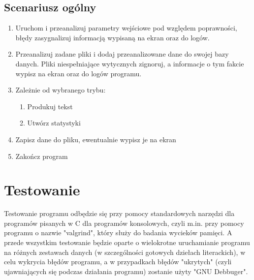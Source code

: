 \documentclass[a4paper,11pt]{article}
\begin{document}
	\subsection{Scenariusz ogólny}
	\begin{enumerate}
		\item Uruchom i przeanalizuj parametry wejściowe pod względem poprawności, błędy zasygnalizuj informacją wypisaną na ekran oraz do logów.
		\item Przeanalizuj zadane pliki i dodaj przeanalizowane dane do swojej bazy danych. Pliki niespełniające wytycznych zignoruj, a informacje o tym fakcie wypisz na ekran oraz do logów programu.
		\item Zależnie od wybranego trybu: 
			\begin{enumerate}
				\item Produkuj tekst
				\item Utwórz statystyki
			\end{enumerate}
		\item Zapisz dane do pliku, ewentualnie wypisz je na ekran
		\item Zakończ program
	\end{enumerate}
	
\section{Testowanie}
	Testowanie programu odbędzie się przy pomocy standardowych narzędzi dla programów pisanych w C dla programów konsolowych, czyli m.in. przy pomocy programu o nazwie "valgrind", który służy do badania wycieków pamięci. A przede wszystkim testowanie będzie oparte o wielokrotne uruchamianie programu na różnych zestawach danych (w szczególności gotowych dziełach literackich), w celu wykrycia błędów programu, a w przypadkach błędów "ukrytych" (czyli ujawniających się podczas działania programu) zostanie użyty "GNU Debbuger".
\end{document}
